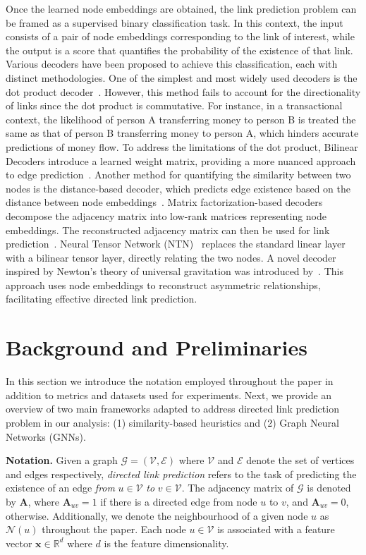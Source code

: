 \documentclass{article}
\begin{document}
Once the learned node embeddings are obtained, the link prediction problem can be framed as a supervised binary classification task. In this context, the input consists of a pair of node embeddings corresponding to the link of interest, while the output is a score that quantifies the probability of the existence of that link. Various decoders have been proposed to achieve this classification, each with distinct methodologies. One of the simplest and most widely used decoders is the dot product decoder~\citep{kipf2016semi}. However, this method fails to account for the directionality of links since the dot product is commutative. For instance, in a transactional context, the likelihood of person A transferring money to person B is treated the same as that of person B transferring money to person A, which hinders accurate predictions of money flow. To address the limitations of the dot product, Bilinear Decoders introduce a learned weight matrix, providing a more nuanced approach to edge prediction~\citep{yang2014embedding}. Another method for quantifying the similarity between two nodes is the distance-based decoder, which predicts edge existence based on the distance between node embeddings~\citep{ou2016asymmetric}. Matrix factorization-based decoders decompose the adjacency matrix into low-rank matrices representing node embeddings. The reconstructed adjacency matrix can then be used for link prediction~\citep{tang2015line}. Neural Tensor Network (NTN)~\citep{socher2013reasoning} replaces the standard linear layer with a bilinear tensor layer, directly relating the two nodes.  A novel decoder inspired by Newton's theory of universal gravitation was introduced by~\cite{salha2019gravity}. This approach uses node embeddings to reconstruct asymmetric relationships, facilitating effective directed link prediction.

\section{Background and Preliminaries}\label{sec:background}
In this section we introduce the notation employed throughout the paper in addition to metrics and datasets used for experiments. Next, we provide an overview of two main frameworks adapted to address directed link prediction problem in our analysis: (1) similarity-based heuristics and (2) Graph Neural Networks (GNNs). 

\textbf{Notation.} Given a graph $\mathcal{G}= (\mathcal{V}, \mathcal{E})$ where $\mathcal{V}$ and $\mathcal{E}$ denote the set of vertices and edges respectively, \emph{directed link prediction} refers to the task of predicting the existence of an edge \emph{from} $u \in\mathcal{V}$ \emph{to} $v \in\mathcal{V}$. The adjacency matrix of $\mathcal{G}$ is denoted by $\mathbf{A}$, where $\mathbf{A}_{uv} = 1$ if there is a directed edge from node $u$ to $v$, and $\mathbf{A}_{uv} = 0$, otherwise. Additionally, we denote the neighbourhood of a given node $u$ as $\mathcal{N}(u)$ throughout the paper. Each node $u \in \mathcal{V}$ is associated with a feature vector $\mathbf{x} \in \mathbb{R}^{d}$ where $d$ is the feature dimensionality.  
\end{document}
